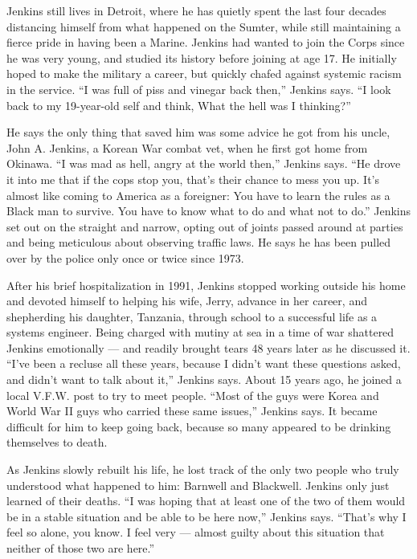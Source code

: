Jenkins still lives in Detroit, where he has quietly spent the last four
decades distancing himself from what happened on the Sumter, while still
maintaining a fierce pride in having been a Marine. Jenkins had wanted
to join the Corps since he was very young, and studied its history
before joining at age 17. He initially hoped to make the military a
career, but quickly chafed against systemic racism in the service. ``I
was full of piss and vinegar back then,'' Jenkins says. ``I look back to
my 19-year-old self and think, What the hell was I thinking?''

He says the only thing that saved him was some advice he got from his
uncle, John A. Jenkins, a Korean War combat vet, when he first got home
from Okinawa. ``I was mad as hell, angry at the world then,'' Jenkins
says. ``He drove it into me that if the cops stop you, that's their
chance to mess you up. It's almost like coming to America as a
foreigner: You have to learn the rules as a Black man to survive. You
have to know what to do and what not to do.'' Jenkins set out on the
straight and narrow, opting out of joints passed around at parties and
being meticulous about observing traffic laws. He says he has been
pulled over by the police only once or twice since 1973.

After his brief hospitalization in 1991, Jenkins stopped working outside
his home and devoted himself to helping his wife, Jerry, advance in her
career, and shepherding his daughter, Tanzania, through school to a
successful life as a systems engineer. Being charged with mutiny at sea
in a time of war shattered Jenkins emotionally --- and readily brought
tears 48 years later as he discussed it. ``I've been a recluse all these
years, because I didn't want these questions asked, and didn't want to
talk about it,'' Jenkins says. About 15 years ago, he joined a local
V.F.W. post to try to meet people. ``Most of the guys were Korea and
World War II guys who carried these same issues,'' Jenkins says. It
became difficult for him to keep going back, because so many appeared to
be drinking themselves to death.

As Jenkins slowly rebuilt his life, he lost track of the only two people
who truly understood what happened to him: Barnwell and Blackwell.
Jenkins only just learned of their deaths. ``I was hoping that at least
one of the two of them would be in a stable situation and be able to be
here now,'' Jenkins says. ``That's why I feel so alone, you know. I feel
very --- almost guilty about this situation that neither of those two
are here.''

